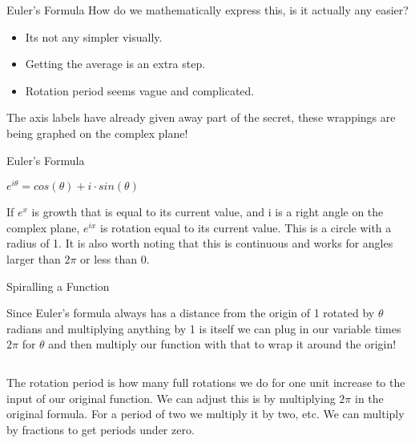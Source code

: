 \documentclass{beamer}
\begin{document}
\begin{frame}{Euler's Formula}
  How do we mathematically express this, is it actually any easier?

  \begin{itemize}
    \item Its not any simpler visually.
    \item Getting the average is an extra step.
    \item Rotation period seems vague and complicated.
  \end{itemize}


  The axis labels have already given away part of the secret, these wrappings are being graphed on the complex plane!
\end{frame}

\begin{frame}{Euler's Formula}
  \unitCircle[0.6\linewidth]
  \begin{center}
    $e^{i\theta}=cos(\theta)+i\cdot sin(\theta)$
  \end{center}
\end{frame}

\begin{frame}
  If $e^x$ is growth that is equal to its current value, and i is a right angle on the complex plane, $e^{ix}$ is rotation equal to its current value. This is a circle with a radius of 1. It is also worth noting that this is continuous and works for angles larger than $2\pi$ or less than 0.

\end{frame}

\begin{frame}{Spiralling a Function}

  Since Euler's formula always has a distance from the origin of 1 rotated by $\theta$ radians and multiplying anything by 1 is itself we can plug in our variable times $2\pi$ for $\theta$ and then multiply our function with that to wrap it around the origin!

  \begin{columns}
  \end{columns}
\end{frame}

\begin{frame}
  The rotation period is how many full rotations we do for one unit increase to the input of our original function. We can adjust this is by multiplying $2\pi$ in the original formula. For a period of two we multiply it by two, etc. We can multiply by fractions to get periods under zero.

  \begin{columns}
  \end{columns}

\end{frame}
\end{document}
